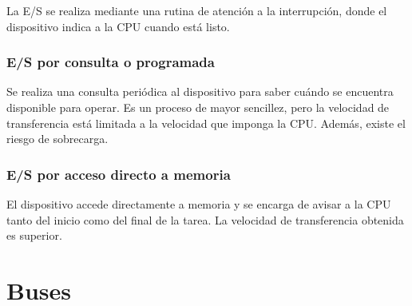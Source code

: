 \documentclass[a4paper, 11pt, titlepage]{article}
\begin{document}
            La E/S se realiza mediante una rutina de atención a la interrupción, donde el dispositivo 
            indica a la CPU cuando está listo.

        \subsubsection{E/S por consulta o programada}

            Se realiza una consulta periódica al dispositivo para saber cuándo se encuentra disponible 
            para operar. Es un proceso de mayor sencillez, pero la velocidad de transferencia está limitada 
            a la velocidad que imponga la CPU. Además, existe el riesgo de sobrecarga.

        \subsubsection{E/S por acceso directo a memoria}

            El dispositivo accede directamente a memoria y se encarga de avisar a la CPU tanto del inicio 
            como del final de la tarea. La velocidad de transferencia obtenida es superior.

\section{Buses}
\end{document}

